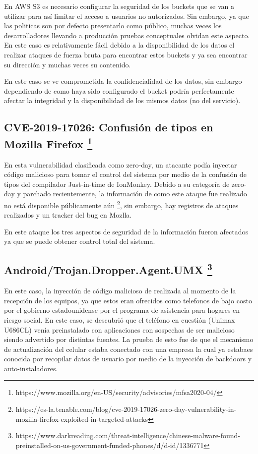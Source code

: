 \documentclass[11pt]{utalcaDoc}
\begin{document}
En AWS S3 es necesario configurar la seguridad de los buckets que se van a utilizar para así limitar el acceso a usuarios no autorizados. Sin embargo, ya que las politicas son por defecto presentarlo como público, muchas veces los desarrolladores llevando a producción pruebas conceptuales olvidan este aspecto. En este caso es relativamente fácil debido a la disponibilidad de los datos el realizar ataques de fuerza bruta para encontrar estos buckets y ya sea encontrar su dirección y muchas veces su contenido.

En este caso se ve comprometida la confidencialidad de los datos, sin embargo dependiendo de como haya sido configurado el bucket podría perfectamente afectar la integridad y la disponibilidad de los mismos datos (no del servicio).



\subsection{
    CVE-2019-17026:  Confusión de tipos en Mozilla Firefox
    \footnote{ https://www.mozilla.org/en-US/security/advisories/mfsa2020-04/ }
}

En esta vulnerabilidad clasificada como zero-day, un atacante podía inyectar código malicioso para tomar el control del sistema por medio de la confusión de tipos del compilador Just-in-time de IonMonkey. Debido a su categoría de zero-day y parchado recientemente, la información de como este ataque fue realizado no está disponible públicamente aún \footnote{https://es-la.tenable.com/blog/cve-2019-17026-zero-day-vulnerability-in-mozilla-firefox-exploited-in-targeted-attacks}, sin embargo, hay registros de ataques realizados y un tracker del bug en Mozlla.

En este ataque los tres aspectos de seguridad de la información fueron afectados ya que se puede obtener control total del sistema.


\subsection{
    Android/Trojan.Dropper.Agent.UMX
    \footnote{ https://www.darkreading.com/threat-intelligence/chinese-malware-found-preinstalled-on-us-government-funded-phones/d/d-id/1336771 }
}

En este caso, la inyección de código malicioso de realizada al momento de la recepción de los equipos, ya que estos eran ofrecidos como telefonos de bajo costo por el gobierno estadounidense por el programa de asistencia para hogares en riesgo social. En este caso, se descubrió que el teléfono en cuestión (Unimax U686CL) venía preinstalado con aplicaciones con sospechas de ser malicioso siendo advertido por distintas fuentes. La prueba de esto fue de que el mecanismo de actualización del celular estaba conectado con una empresa la cual ya estabaes conocida por recopilar datos de usuario por medio de la inyección de backdoors y auto-instaladores.
\end{document}
